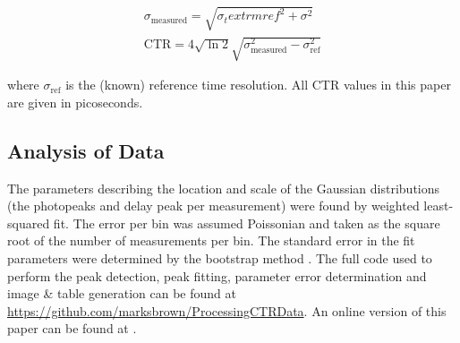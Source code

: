 \begin{align}
\sigma_\textrm{measured} = \sqrt{\sigma_textrm{ref}^2+\sigma^2}\\
\text{CTR} = 4\sqrt{\ln{2}}\sqrt{\sigma_\textrm{measured}^2-\sigma_\textrm{ref}^2}
\end{align}

where $\sigma_\text{ref}$ is the (known) reference time resolution. All CTR values in this paper are given in picoseconds.

\subsection{Analysis of Data}
The parameters describing the location and scale of the Gaussian distributions (the photopeaks and delay peak per measurement) were found by weighted least-squared fit. The error per bin was assumed Poissonian and taken as the square root of the number of measurements per bin. The standard error in the fit parameters were determined by the bootstrap method \cite{degroot2012probability}. The full code used to perform the peak detection, peak fitting, parameter error determination and image \& table generation can be found at \href{https://github.com/marksbrown/ProcessingCTRData}{https://github.com/marksbrown/ProcessingCTRData}. An online version of this paper can be found at \cite{Brown2014}.